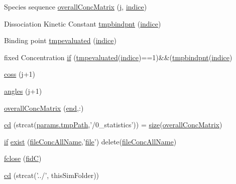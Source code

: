 \begin{DoxyCompactItemize}
\item 
Species sequence \hyperlink{a00025_aafaf668a3a1fbcc622062635e470ba72}{overall\+Conc\+Matrix} (\hyperlink{a00110_ac86694252f8dfdb19aaeadc4b7c342c6}{j}, \hyperlink{a00025_a776b2bbd08be028d44f6d4260f27633a}{indice})
\item 
Dissociation Kinetic Constant \hyperlink{a00025_a00f81a9dbc71b6c82583a1be559f70e2}{tmpbindpnt} (\hyperlink{a00025_a776b2bbd08be028d44f6d4260f27633a}{indice})
\item 
Binding point \hyperlink{a00025_a578805b808d01076403bf6fb9f7f0dab}{tmpevaluated} (\hyperlink{a00025_a776b2bbd08be028d44f6d4260f27633a}{indice})
\item 
fixed Concentration \hyperlink{a00025_ab824f8578204315feac8f0d0c6f25b2c}{if} (\hyperlink{a00025_a578805b808d01076403bf6fb9f7f0dab}{tmpevaluated}(\hyperlink{a00025_a776b2bbd08be028d44f6d4260f27633a}{indice})==1)\&\&(\hyperlink{a00025_a00f81a9dbc71b6c82583a1be559f70e2}{tmpbindpnt}(\hyperlink{a00025_a776b2bbd08be028d44f6d4260f27633a}{indice})
\item 
\hyperlink{a00025_aef980037b6271b6ab8be33ae415ef453}{coss} (\hyperlink{a00110_ac86694252f8dfdb19aaeadc4b7c342c6}{j}+1)
\item 
\hyperlink{a00025_ab0f774a1c2475b84dc2f125473693bc2}{angles} (\hyperlink{a00110_ac86694252f8dfdb19aaeadc4b7c342c6}{j}+1)
\item 
\hyperlink{a00025_a91ebfde92d1bf0522290062b808c9e9e}{overall\+Conc\+Matrix} (\hyperlink{a00025_afb358f48b1646c750fb9da6c6585be2b}{end},\+:)
\item 
\hyperlink{a00025_a4745c86f44382225b251e3640cb2fe63}{cd} (strcat(\hyperlink{a00032_a1e5a4863ab2b87f923e1d19e2da1f5ac}{params.\+tmp\+Path},'/0\+\_\+statistics')) = \hyperlink{a00104_ae113ea7f9e515a12ac4b5595c6faf61e}{size}(\hyperlink{a00025_a576dd8edd1b0fd4cc65709a59b308518}{overall\+Conc\+Matrix})
\item 
\hyperlink{a00030_a01d55766b8058903dd360b4bda71f9f5}{if} \hyperlink{a00025_ab05bb9470ea34cab3ab1c2c9e748840b}{exist} (\hyperlink{a00025_a45b397c4e1bd8e68da97ba6d26fbb41f}{file\+Conc\+All\+Name},'\hyperlink{a00110_a4e8353d6c62cf54bf4a1a8f63e56b8c3}{file}') delete(\hyperlink{a00025_a45b397c4e1bd8e68da97ba6d26fbb41f}{file\+Conc\+All\+Name})
\item 
\hyperlink{a00025_a210fb0ae3c985ed0d3c1d439a131b48c}{fclose} (\hyperlink{a00025_a5650dbe23ad9065391c1ea56f8acd34c}{fid\+C})
\item 
\hyperlink{a00025_a31bfd2803e4b18891d268c6a018db432}{cd} (strcat('../', this\+Sim\+Folder))

\end{DoxyCompactItemize}
